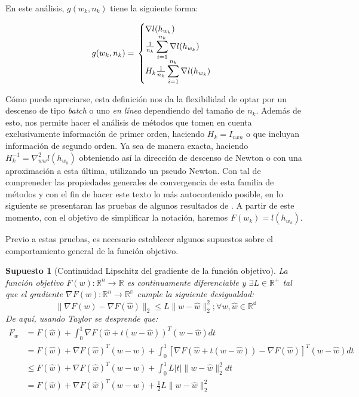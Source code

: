 \documentclass{book}
\theoremstyle{plain}
\newtheorem{assump}{Supuesto}[thm]
\theoremstyle{definition}
\theoremstyle{remark}
\begin{document}
En este análisis, $g(w_k, n_k)$ tiene la siguiente forma:

\[
g(w_k, n_k) = \\
\begin{cases}
      \nabla l(h_{w_k}) \\
      \frac{1}{n_k}\displaystyle\sum_{i=1}^{n_k}\nabla l(h_{w_k}) \\
      H_k \frac{1}{n_k}\displaystyle\sum_{i=1}^{n_k}\nabla l(h_{w_k})
   \end{cases}
\]

Cómo puede apreciarse, esta definición nos da la flexibilidad de optar por un descenso de tipo \emph{batch} o uno  \emph{en línea} dependiendo del tamaño de $n_k$. Además de esto, nos permite hacer el análisis de métodos que tomen en cuenta exclusivamente información de primer orden, haciendo $H_k = I_{nxn}$ o que incluyan información de segundo orden. Ya sea de manera exacta, haciendo $H^{-1}_k = \nabla^2_{ww}l(h_{w_k})$ obteniendo así la dirección de descenso de Newton o con una aproximación a esta última, utilizando un pseudo Newton. Con tal de compreneder las propiedades generales de convergencia de esta familia de métodos y con el fin de hacer este texto lo más autocontenido posible, en lo siguiente se presentaran las pruebas de algunos resultados de \cite{BOTTOU}. A partir de este momento, con el objetivo de simplificar la notación, haremos $F(w_k) = l(h_{w_k})$.

Previo a estas pruebas, es necesario establecer algunos supuestos sobre el comportamiento general de la función objetivo.

\begin{assump}[Continuidad Lipschitz del gradiente de la función objetivo]\label{assump:lipschitz}
La función objetivo $F(w):\mathbb{R}^n\rightarrow\mathbb{R}$ es continuamente diferenciable y $\exists L\in\mathbb{R^+}$ tal que el gradiente $\nabla F(w):\mathbb{R}^n\rightarrow\mathbb{R^n}$ cumple la siguiente desigualdad:
\begin{equation}
    \|\nabla F(w)- \nabla F(\hat{w})\|_2 \leq L\|w-\hat{w}\|_2^2; \forall w, \hat{w} \in \mathbb{R^d}
\end{equation}
De aquí, usando Taylor se desprende que:
\begin{equation*}
    \begin{split}
    F_w & = F(\hat{w}) + \int_0^1\nabla F(\hat{w} + t(w- \hat{w}))^T(w-\hat{w})dt\\
    &= F(\hat{w}) + \nabla F(\hat{w})^T(w- \hat{w}) + \int_0^1[\nabla F(\hat{w} + t(w- \hat{w})) - \nabla F(\hat{w})]^T(w-\hat{w})dt\\
    &\leq F(\hat{w}) + \nabla F(\hat{w})^T(w- \hat{w}) + \int_0^1L|t|\|w - \hat{w}\|_2^2dt\\
    &= F(\hat{w}) + \nabla F(\hat{w})^T(w- \hat{w}) + \frac{1}{2}L\|w - \hat{w}\|_2^2
    \end{split}
\end{equation*}
\end{assump}
\end{document}
